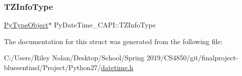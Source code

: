 \mbox{\label{struct_py_date_time___c_a_p_i_a967e1a42dd00881315101a1f09ee61c8}} 
\subsubsection{\texorpdfstring{TZInfoType}{TZInfoType}}
{\footnotesize\ttfamily \mbox{\hyperlink{_python27_2object_8h_a42a55dd6e973872c7a6bc61632070f6f}{Py\+Type\+Object}}$\ast$ Py\+Date\+Time\+\_\+\+C\+A\+P\+I\+::\+T\+Z\+Info\+Type}



The documentation for this struct was generated from the following file\+:\begin{DoxyCompactItemize}
\item 
C\+:/\+Users/\+Riley Nolan/\+Desktop/\+School/\+Spring 2019/\+C\+S4850/git/finalproject-\/bluesentinel/\+Project/\+Python27/\mbox{\hyperlink{datetime_8h}{datetime.\+h}}\end{DoxyCompactItemize}
